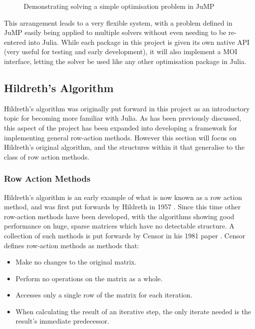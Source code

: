 \begin{figure}[t]
    \centering
    
    \caption{Demonstrating solving a simple optimisation problem in JuMP}
    \label{fig:jump_optimisation_demo}
\end{figure}

This arrangement leads to a very flexible system, with a problem defined in JuMP easily being applied to multiple solvers without even needing to be re-entered into Julia. While each package in this project is given its own native API (very useful for testing and early development), it will also implement a MOI interface, letting the solver be used like any other optimisation package in Julia.

\subsection{Hildreth's Algorithm}\label{sub_hildreth}
Hildreth's algorithm was originally put forward in this project as an introductory topic for becoming more familiar with Julia. As has been previously discussed, this aspect of the project has been expanded into developing a framework for implementing general row-action methods. However this section will focus on Hildreth's original algorithm, and the structures within it that generalise to the class of row action methods.

\subsubsection{Row Action Methods}
Hildreth's algorithm is an early example of what is now known as a row action method, and was first put forwards by Hildreth in 1957 \cite{HildrethAPROCEDURE}. Since this time other row-action methods have been developed, with the algorithms showing good performance on huge, sparse matrices which have no detectable structure. A collection of such methods is put forwards by Censor in his 1981 paper \cite{ROW-ACTIONCENSORS}. Censor defines row-action methods as methods that:

\begin{itemize}
    \item Make no changes to the original matrix.
    \item Perform no operations on the matrix as a whole.
    \item Accesses only a single row of the matrix for each iteration.
    \item When calculating the result of an iterative step, the only iterate needed is the result's immediate predecessor. 
\end{itemize}

